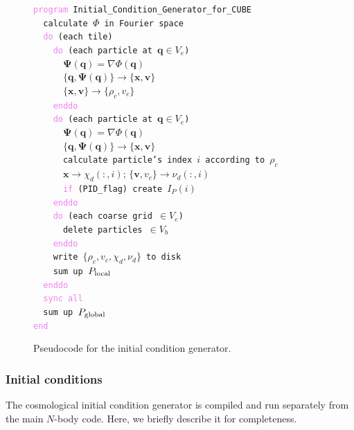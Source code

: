 \documentclass[10pt,twocolumn,preprint]{emulateapj}
\newcommand{\bs}{\boldsymbol}
\newcommand{\tcv}{\textcolor{violet}}
\begin{document}
\begin{figure}[t]
{\tt \tcv{program} Initial\_Condition\_Generator\_for\_CUBE\\
\indent \ \ calculate $\Phi$ in Fourier space\\
\indent \ \ \tcv{do} (each tile)\\
\indent \ \ \ \ \tcv{do} (each particle at ${\bs q}\in V_e$)\\
\indent \ \ \ \ \ \ ${\bs \Psi}({\bs q})=\nabla\Phi({\bs q})$\\
\indent \ \ \ \ \ \ $\{{\bs q},{\bs\Psi({\bs q})}\}\rightarrow\{{\bs x},{\bs v}\}$\\
\indent \ \ \ \ \ \ $\{{\bs x},{\bs v}\}\rightarrow \{\rho_c,v_c\}$\\
\indent \ \ \ \     \tcv{enddo}\\
\indent \ \ \ \ \tcv{do} (each particle at ${\bs q}\in V_e$)\\
\indent \ \ \ \ \ \ ${\bs \Psi}({\bs q})=\nabla\Phi({\bs q})$\\
\indent \ \ \ \ \ \ $\{{\bs q},{\bs\Psi({\bs q})}\}\rightarrow\{{\bs x},{\bs v}\}$\\
\indent \ \ \ \ \ \ calculate particle's index $i$ according to $\rho_c$\\
\indent \ \ \ \ \ \ ${\bs x}\rightarrow\chi_d(:,i);\,\{{\bs v},v_c\}\rightarrow\nu_d(:,i)$\\
\indent \ \ \ \ \ \ \tcv{if} (PID\_flag) create $I_P(i)$\\
\indent \ \ \ \ \tcv{enddo}\\
\indent \ \ \ \ \tcv{do} (each coarse grid $\in V_e$)\\
\indent \ \ \ \ \ \ delete particles $\in V_b$\\
\indent \ \ \ \ \tcv{enddo}\\
\indent \ \ \ \ write $\{\rho_c,v_c,\chi_d,\nu_d\}$ to disk\\
\indent \ \ \ \ sum up $P_{\rm local}$\\
\indent \ \ \tcv{enddo}\\
\indent \ \ \tcv{sync all}\\
\indent \ \ sum up $P_{\rm global}$\\
\tcv{end}\\}
\caption{Pseudocode for the initial condition generator.}
\label{fig.ic}
\end{figure}

\subsubsection{Initial conditions}\label{sss.ic}
The cosmological initial condition generator is compiled and run separately from the main $N$-body code. Here, we briefly describe it for completeness.
\end{document}
